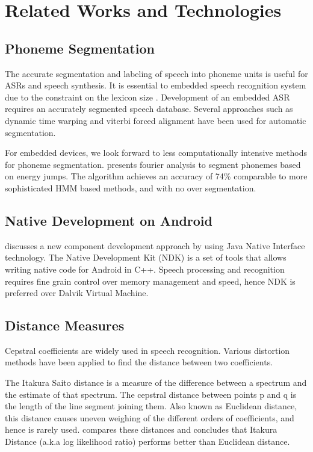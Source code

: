 \chapter{Related Works and Technologies} \label{ch:survey}

\section{Phoneme Segmentation}

The accurate segmentation and labeling of speech into phoneme units is useful for ASRs and speech synthesis. It is essential to embedded speech recognition system due to the constraint on the lexicon size \cite{1327109}. Development of an embedded ASR requires an accurately segmented speech database. Several approaches such as dynamic time warping \cite{phoneme-dtw} and viterbi forced alignment \cite{brugnara1993automatic} have been used for automatic segmentation.

For embedded devices, we look forward to less computationally intensive methods for phoneme segmentation. \cite{986241} presents fourier analysis to segment phonemes based on energy jumps. The algorithm achieves an accuracy of 74\% comparable to more sophisticated HMM based methods, and with no over segmentation.

\section{Native Development on Android}

\cite{5600170} discusses a new component development approach by using Java Native Interface technology. The Native Development Kit (NDK) is a set of tools that allows writing native code for Android in C++. Speech processing and recognition requires fine grain control over memory management and speed, hence NDK is preferred over Dalvik Virtual Machine.

\section{Distance Measures}

Cepstral coefficients are widely used in speech recognition. Various distortion methods have been applied to find the distance between two coefficients.

The Itakura Saito distance is a measure of the difference between a spectrum and the estimate of that spectrum. The cepstral distance between points p and q is the length of the line segment joining them. Also known as Euclidean distance, this distance causes uneven weighing of the different orders of coefficients, and hence is rarely used. \cite{1168478} compares these distances and concludes that Itakura Distance (a.k.a log likelihood ratio) performs better than Euclidean distance.

